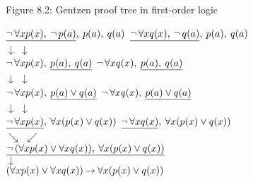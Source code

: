 \documentclass[style=simple,size=12pt]{powerdot}
\begin{document}
\begin{wideslide}[bm=,toc=]{Figure 8.2: Gentzen proof tree in
first-order logic}
\begin{center}
$\underline{\mathop{\neg} \forall xp(x),\: \mathop{\neg} p(a)}
,\: p(a),\: q(a)$ \hspace{2em}
$\underline{\mathop{\neg} \forall xq(x),\: \mathop{\neg} q(a)}
,\: p(a),\: q(a)$ \\
$\downarrow$ \hspace{10em} $\downarrow$\\
$\mathop{\neg} \forall xp(x),\: \underline{p(a),\: q(a)}$ \hspace{2em}
$\mathop{\neg} \forall xq(x),\: \underline{p(a),\: q(a)}$ \\
$\downarrow$ \hspace{10em} $\downarrow$\\
$\mathop{\neg} \forall xp(x),\: \underline{p(a) \vee  q(a)}$ \hspace{2em}
$\mathop{\neg} \forall xq(x),\: \underline{p(a) \vee q(a)}$ \\
$\downarrow$ \hspace{10em} $\downarrow$\\
$\underline{\mathop{\neg} \forall xp(x)},\: \forall x(p(x) \vee  q(x))$ \hspace{2em}
$\underline{\mathop{\neg} \forall xq(x)},\: \forall x(p(x) \vee q(x))$ \\
$\searrow$ \hspace{8em} $\swarrow$\\
$\underline{\mathop{\neg}\,(\forall xp(x) \vee \forall xq(x)),\:
  \forall x(p(x) \vee  q(x))}$ \\
$\downarrow$ \\
$(\forall xp(x) \vee \forall xq(x)) \mathbin{\rightarrow}
\forall x(p(x) \vee q(x))$ \\
\end{center}
\end{wideslide}
\end{document}
